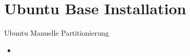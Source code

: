 \section{Ubuntu Base Installation}

\begin{frame}[fragile]{Ubuntu Manuelle Partitionierung}
  \begin{itemize}
    \item
  \end{itemize}
\end{frame}

